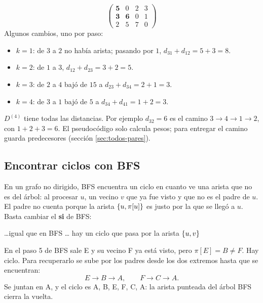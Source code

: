 \documentclass[11pt,letterpaper]{article}
\begin{document}
\begin{ejemplo}
\[\begin{pmatrix}
      \mathbf{5} & 0 & 2 & 3 \\
      \mathbf{3} & \mathbf{6} & 0 & 1 \\
      2 & 5 & 7 & 0
    \end{pmatrix}
  \]
  Algunos cambios, uno por paso:
  \begin{itemize}[itemsep=0.1em]
    \item $k = 1$: de $3$ a $2$ no había arista; pasando por $1$,
          $d_{31} + d_{12} = 5 + 3 = 8$.
    \item $k = 2$: de $1$ a $3$, $d_{12} + d_{23} = 3 + 2 = 5$.
    \item $k = 3$: de $2$ a $4$ bajó de $15$ a $d_{23} + d_{34} =
          2 + 1 = 3$.
    \item $k = 4$: de $3$ a $1$ bajó de $5$ a $d_{34} + d_{41} =
          1 + 2 = 3$.
  \end{itemize}
  $D^{(4)}$ tiene todas las distancias. Por ejemplo
  $d_{32} = 6$ es el camino $3 \to 4 \to 1 \to 2$, con
  $1 + 2 + 3 = 6$. El pseudocódigo solo calcula pesos; para entregar
  el camino guarda predecesores (sección \ref{sec:todos-pares}).
\end{ejemplo}


\subsection*{Encontrar ciclos con BFS}

En un grafo no dirigido, BFS encuentra un ciclo en cuanto ve una
arista que no es del árbol: al procesar $u$, un vecino $v$ que ya fue
visto y que no es el padre de $u$. El padre no cuenta porque la arista
$\left\{ u, \pi[u] \right\}$ es justo por la que se llegó a $u$. Basta cambiar el
\textbf{si} de BFS:

\begin{algorithm}[H]
\caption{Cambio a \textsc{BFS} para detectar un ciclo}
\begin{algorithmic}[1]
    \State \ldots igual que en BFS \ldots
    \State \Return hay un ciclo que pasa por la arista $\left\{ u, v \right\}$
  \EndIf
\EndFor
\end{algorithmic}
\end{algorithm}

\begin{ejemplo}[El ciclo de $G$]
  En el paso 5 de BFS sale E y su vecino F ya está visto, pero
  $\pi[E] = B \neq F$. Hay ciclo. Para recuperarlo se sube por los
  padres desde los dos extremos hasta que se encuentran:
  \[
    E \to B \to A , \qquad F \to C \to A .
  \]
  Se juntan en A, y el ciclo es A, B, E, F, C, A: la arista punteada
  del árbol BFS cierra la vuelta.
\end{ejemplo}
\end{document}
